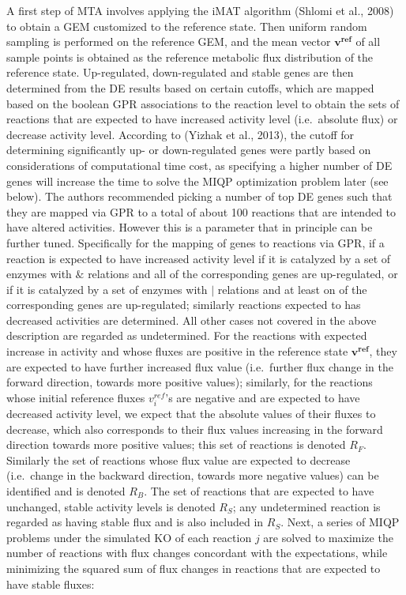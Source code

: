 \documentclass[12pt,twoside,openany,\mydriver]{thesis}  %
\begin{document}
A first step of MTA involves applying the iMAT algorithm (Shlomi et al., 2008) to obtain a GEM customized to the reference state. Then uniform random sampling is performed on the reference GEM, and the mean vector \(\mathbf{v^{ref}}\) of all sample points is obtained as the reference metabolic flux distribution of the reference state. Up-regulated, down-regulated and stable genes are then determined from the DE results based on certain cutoffs, which are mapped based on the boolean GPR associations to the reaction level to obtain the sets of reactions that are expected to have increased activity level (i.e.~absolute flux) or decrease activity level. According to (Yizhak et al., 2013), the cutoff for determining significantly up- or down-regulated genes were partly based on considerations of computational time cost, as specifying a higher number of DE genes will increase the time to solve the MIQP optimization problem later (see below). The authors recommended picking a number of top DE genes such that they are mapped via GPR to a total of about 100 reactions that are intended to have altered activities. However this is a parameter that in principle can be further tuned. Specifically for the mapping of genes to reactions via GPR, if a reaction is expected to have increased activity level if it is catalyzed by a set of enzymes with \(\&\) relations and all of the corresponding genes are up-regulated, or if it is catalyzed by a set of enzymes with \(|\) relations and at least on of the corresponding genes are up-regulated; similarly reactions expected to has decreased activities are determined. All other cases not covered in the above description are regarded as undetermined. For the reactions with expected increase in activity and whose fluxes are positive in the reference state \(\mathbf{v^{ref}}\), they are expected to have further increased flux value (i.e.~further flux change in the forward direction, towards more positive values); similarly, for the reactions whose initial reference fluxes \(v^{ref}_i\)'s are negative and are expected to have decreased activity level, we expect that the absolute values of their fluxes to decrease, which also corresponds to their flux values increasing in the forward direction towards more positive values; this set of reactions is denoted \(R_F\). Similarly the set of reactions whose flux value are expected to decrease (i.e.~change in the backward direction, towards more negative values) can be identified and is denoted \(R_B\). The set of reactions that are expected to have unchanged, stable activity levels is denoted \(R_S\); any undetermined reaction is regarded as having stable flux and is also included in \(R_S\). Next, a series of MIQP problems under the simulated KO of each reaction \(j\) are solved to maximize the number of reactions with flux changes concordant with the expectations, while minimizing the squared sum of flux changes in reactions that are expected to have stable fluxes:
\end{document}
